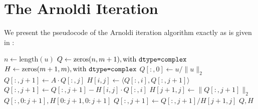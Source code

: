 \section{The Arnoldi Iteration}

We present the pseudocode of the Arnoldi iteration algorithm exactly as is given in \citet{arnoldi2025lab}:

\begin{algorithm}[H]
    \begin{algorithmic}
        \State$n\gets\text{length}(u)$
        \State$Q\gets\text{zeros}(n,m+1),\text{with }\verb|dtype=complex|$
        \State$H\gets\text{zeros}(m+1,m),\text{with }\verb|dtype=complex|$
        \State$Q[:,0]\gets u/\|u\|_2$
        \State$Q[:,j+1]\gets A\cdot Q[:,j]$
        \State$H[i,j]\gets\langle Q[:,i],Q[:,j+1]\rangle$
        \State$Q[:,j+1]\gets Q[:,j+1]-H[i,j]\cdot Q[:,i]$
        \EndFor
        \State$H[j+1,j]\gets\|Q[:,j+1]\|_2$
        \State\Return$Q[:,0{:}j+1],H[0{:}j+1,0{:}j+1]$
        \EndIf
        \State$Q[:,j+1]\gets Q[:,j+1]/H[j+1,j]$
        \EndFor
        \State\Return$Q,H$
        \EndProcedure
    \end{algorithmic}
\end{algorithm}

